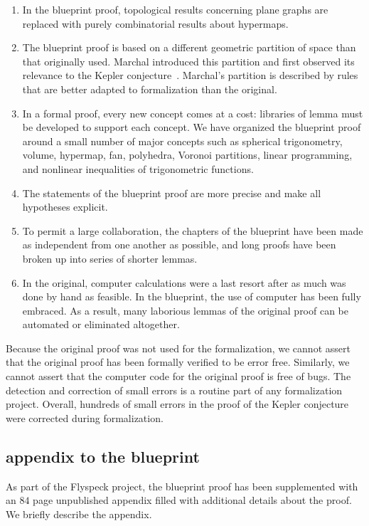 \begin{enumerate}
\item In the blueprint proof, topological results concerning plane
  graphs are replaced with purely combinatorial results about
  hypermaps.  
\item The blueprint proof is based on a different geometric partition
  of space than that originally used.  Marchal introduced this
  partition and first observed its relevance to the Kepler
  conjecture~\cite{marchal:2009}.  Marchal's partition is described by
  rules that are better adapted to formalization than the original.
 \item In a formal proof, every new concept comes at a cost: libraries
   of lemma must be developed to support each concept.  We have
   organized the blueprint proof around a small number of major
   concepts such as spherical trigonometry, volume, hypermap, fan,
   polyhedra, Voronoi partitions, linear programming, and nonlinear
   inequalities of trigonometric functions.
 \item The statements of the blueprint proof are more precise and
   make all hypotheses explicit.
 \item To permit a large collaboration, the chapters of the
   blueprint have been made as independent from one another as
   possible, and long proofs have been broken up into series of
   shorter lemmas.
\item In
  the original, computer calculations were a last resort after
  as much was done by hand as feasible.
  In the
  blueprint, the use of computer has been fully embraced.  As a
  result, many laborious lemmas of the original proof can be
  automated or eliminated altogether.
\end{enumerate}


Because the original proof was not used for the formalization, we
cannot assert that the original proof has been formally verified to be
error free.  Similarly, we cannot assert that the computer code for
the original proof is free of bugs.  The detection and correction of
small errors is a routine part of any formalization project.  Overall,
hundreds of small errors in the proof of the Kepler conjecture were
corrected during formalization.  

\subsection{appendix to the blueprint}\label{sec:ab}

As part of the Flyspeck project, the blueprint proof has been
supplemented with an $84$ page unpublished appendix filled with
additional details about the proof.   We briefly describe the
appendix.

